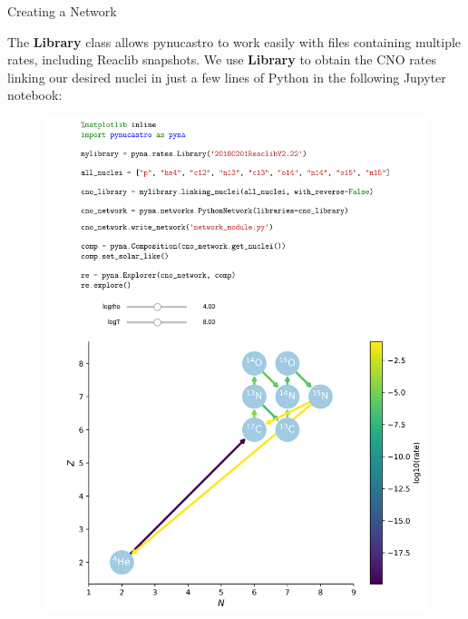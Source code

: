 \documentclass[final]{beamer}
\newlength{\onecolwid}
\newlength{\twocolwid}
\begin{document}
\begin{frame}[t]
\begin{columns}[t]
\begin{column}{\twocolwid}
\begin{columns}[t,totalwidth=\twocolwid]
\begin{column}{\onecolwid}\vspace{-.6in} %


\begin{block}{Creating a Network}

The \textbf{Library} class allows pynucastro to work easily with files
containing multiple rates, including Reaclib snapshots. We use
\textbf{Library} to obtain the CNO rates linking our desired nuclei in
just a few lines of Python in the following Jupyter notebook:

\begin{figure}
\includegraphics[width=1.1\linewidth]{figures/library-examples-nuclei.png}
\end{figure}


\end{block}
\end{column}
\end{columns}
\end{column}
\end{columns}
\end{frame}
\end{document}
